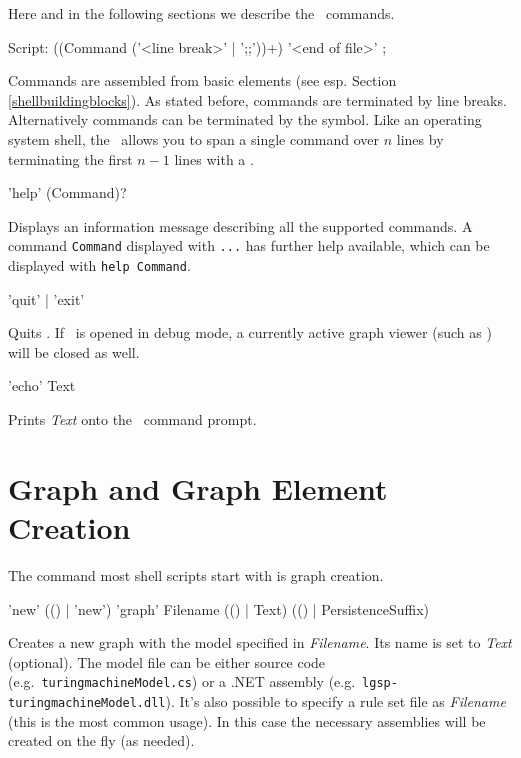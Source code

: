 Here and in the following sections we describe the \GrShell\ commands.

\begin{rail}
  Script: ((Command ('<line break>' | ';;'))+) '<end of file>' ;
\end{rail}
Commands are assembled from basic elements (see esp. Section \ref{shellbuildingblocks}).
As stated before, commands are terminated by line breaks.
Alternatively commands can be terminated by the \indexed{\texttt{;;}} symbol.
Like an operating system shell, the \GrShell\ allows you to span a single command over $n$ lines by terminating the first $n-1$ lines with a .

\begin{rail}
  'help' (Command)?
\end{rail}
Displays an information message describing all the supported commands.
A command \texttt{Command} displayed with \texttt{...} has further help available, which can be displayed with \texttt{help Command}.

\begin{rail}
  'quit' | 'exit'
\end{rail}
Quits \GrShell. If \GrShell\ is opened in debug mode, a currently active graph viewer (such as \yComp) will be closed as well.

\begin{rail}
  'echo' Text
\end{rail}
Prints \emph{Text} onto the \GrShell\ command prompt.


\section{Graph and Graph Element Creation}
\label{graphcreationcommands}

The command most shell scripts start with is graph creation.

\begin{rail}
  'new' (() | 'new') 'graph' Filename (() | Text) (() | PersistenceSuffix)
\end{rail}
Creates a new graph with the model specified in \emph{Filename}.
Its name is set to \emph{Text} (optional).
The model file can be either source code (e.g.\ \texttt{turing\textunderscore machineModel.cs}) or a .NET assembly (e.g.\ \texttt{lgsp-turing\textunderscore machineModel.dll}).
It's also possible to specify a rule set file as \emph{Filename} (this is the most common usage).
In this case the necessary assemblies will be created on the fly (as needed).

